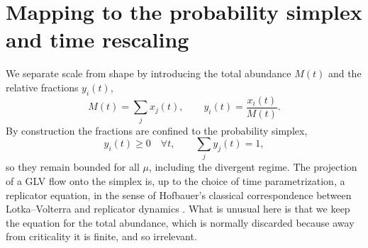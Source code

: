 \section{Mapping to the probability simplex and time rescaling}
\label{sec:simplex-mapping}

We separate scale from shape by introducing the total abundance $M(t)$ and the
relative fractions $y_i(t)$,
\begin{equation}
    M(t) = \sum_j x_j(t), \qquad
    y_i(t) = \frac{x_i(t)}{M(t)} .
    \label{eq:rescaling-def}
\end{equation}
By construction the fractions are confined to the probability simplex,
\begin{equation}
    y_i(t) \ge 0 \quad \forall t, \qquad \sum_j y_j(t) = 1,
\end{equation}
so they remain bounded for all $\mu$, including the divergent regime. The
projection of a GLV flow onto the simplex is, up to the choice of time
parametrization, a replicator equation, in the sense of Hofbauer's classical
correspondence between Lotka--Volterra and replicator dynamics
\cite{hofbauer81}. What is unusual here is that we keep the equation for the
total abundance, which is normally discarded because away from criticality it is
finite, and so irrelevant.

